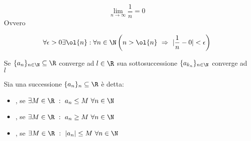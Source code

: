 \documentclass[../analisi.tex]{subfiles}
\begin{document}
\begin{esem}
\begin{equation}
	\lim \limits_{ n \to \infty} \frac{1}{n} = 0
\end{equation}
Ovvero

\begin{equation}
	\forall \epsilon > 0 \exists \ol{n}: \forall n \in \N
	\left( n > \ol{n}\ \Rightarrow\ | \frac{1}{n} - 0 | < \epsilon \right)
\end{equation}
\end{esem}



\begin{defn} 
Se $\{ a_n \}_{n \in \N} \subseteq \R$ converge ad $l \in \R$ 
sua sottosuccessione $ \{ a_{k_n} \}_{n \in \N}$ converge ad $ l $
\end{defn}



\begin{eser}



\end{eser}





\begin{defn}
Sia una successione $ \{ a_n \}_n \subseteq \R $ è detta:

\begin{itemize}
	\item {}, se 
		$ \exists M \in \R\ :\ a_n \leq M\ \forall n \in \N $
	\item {}, se
		$ \exists M \in \R\ :\ a_n \geq M\ \forall n \in \N $
	\item {}, se 
		$ \exists M \in \R\ :\ | a_n | \leq M\ \forall n \in \N $ 
\end{itemize}
\end{defn}
\end{document}
